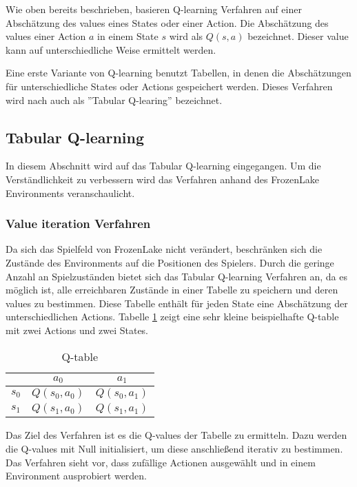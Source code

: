 \documentclass[11pt]{scrartcl}
\begin{document}
Wie oben bereits beschrieben, basieren Q-learning Verfahren auf einer Abschätzung des
values eines States oder einer Action. Die Abschätzung des values einer Action $a$ in
einem State $s$ wird als $Q(s, a)$ bezeichnet. Dieser value kann auf unterschiedliche
Weise ermittelt werden.

Eine erste Variante von Q-learning benutzt Tabellen, in denen die Abschätzungen
für unterschiedliche States oder Actions gespeichert werden. Dieses Verfahren wird nach
\cite[~S.193]{L2018} auch als ''Tabular Q-learing'' bezeichnet.


\subsection{Tabular Q-learning}
\label{sec:tab-q-learning}
In diesem Abschnitt wird auf das Tabular Q-learning eingegangen. Um die
Ver\-ständ\-lich\-keit zu verbessern wird das Verfahren anhand des FrozenLake
Environments veranschaulicht.

\subsubsection{Value iteration Verfahren}
Da sich das Spielfeld von FrozenLake nicht verändert, beschränken sich die Zustände des
Environments auf die Positionen des Spielers. Durch die geringe Anzahl an Spielzuständen
bietet sich das Tabular Q-learning Verfahren an, da es möglich ist, alle erreichbaren
Zustände in einer Tabelle zu speichern und deren values zu bestimmen. Diese Tabelle
enthält für jeden State eine Abschätzung der unterschiedlichen Actions.
Tabelle \ref{tab:q_table} zeigt eine sehr kleine beispielhafte Q-table mit zwei Actions
und zwei States.

\begin{table}[ht]
  \begin{center}
    \begin{tabular}{c | c | c}
       & $a_0$ & $a_1$ \\
      \hline
      $s_0$ & $Q(s_0, a_0)$ &$ Q(s_0, a_1)$ \\
      \hline
      $s_1$ & $Q(s_1, a_0)$ & $Q(s_1, a_1)$ \\
    \end{tabular}

    \caption[Q-table]{Q-table}
    \label{tab:q_table}
  \end{center}
\end{table}

\noindent
Das Ziel des Verfahren ist es die Q-values der Tabelle zu ermitteln. Dazu werden die
Q-values mit Null initialisiert, um diese anschließend iterativ zu bestimmen. Das Verfahren 
sieht vor, dass zufällige Actionen ausgewählt und in einem Environment ausprobiert werden.
\end{document}
